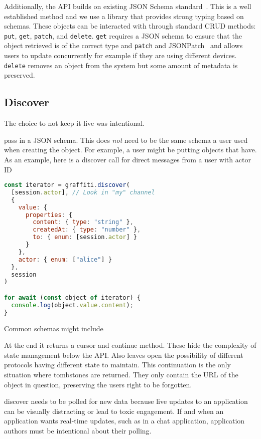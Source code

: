 Additionally, the API builds on existing JSON Schema standard~\cite{jsonschema}.
This is a well established method and we use a library that
provides strong typing based on schemas.
These objects can be interacted with through standard CRUD methods:
\texttt{put}, \texttt{get}, \texttt{patch}, and \texttt{delete}.
\texttt{get} requires a JSON schema to ensure that the object
retrieved is of the correct type and \texttt
\texttt{patch} and JSONPatch~\cite{jsonpatch} and allows users to update
concurrently for example if they are using different devices.
\texttt{delete} removes an object from the system but some amount of
metadata is preserved.

\subsection{Discover}

The choice to not keep it live was intentional.

pass in a JSON schema. This does \emph{not} need to be the same schema a user
used when creating the object. For example, a user might be putting objects that
have.
As an example, here is a discover call for direct messages from
a user with actor ID

\begin{lstlisting}[language=javascript]
const iterator = graffiti.discover(
  [session.actor], // Look in "my" channel
  {
    value: {
      properties: {
        content: { type: "string" },
        createdAt: { type: "number" },
        to: { enum: [session.actor] }
      }
    },
    actor: { enum: ["alice"] }
  },
  session
)

for await (const object of iterator) {
  console.log(object.value.content);
}
\end{lstlisting}

Common schemas might include

At the end it returns a cursor and continue method.
These hide the complexity of state management below the API.
Also leaves open the possibility of different protocols having different state to maintain.
This continuation is the only situation where tombstones are returned.
They only contain the URL of the object in question, preserving the users right to be forgotten.

discover needs to be polled for new data because live updates to an application can be visually distracting or lead to toxic engagement. If and when an application wants real-time updates, such as in a chat application, application authors must be intentional about their polling.

